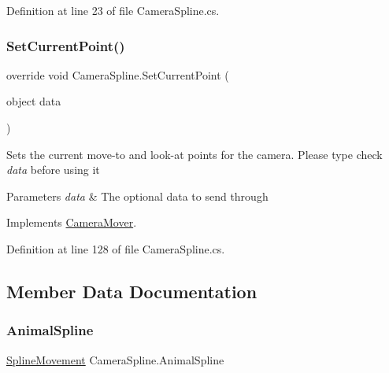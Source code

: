 Definition at line 23 of file Camera\+Spline.\+cs.

\mbox{\label{class_camera_spline_a8ff1f479307c63e3ecc75d089ff1bfcf}} 
\subsubsection{\texorpdfstring{Set\+Current\+Point()}{SetCurrentPoint()}}
{\footnotesize\ttfamily override void Camera\+Spline.\+Set\+Current\+Point (\begin{DoxyParamCaption}\item[{object}]{data }\end{DoxyParamCaption})\hspace{0.3cm}{\ttfamily [virtual]}}



Sets the current move-\/to and look-\/at points for the camera. Please type check {\itshape data}  before using it 


\begin{DoxyParams}{Parameters}
{\em data} & The optional data to send through\\
\hline
\end{DoxyParams}


Implements \mbox{\hyperlink{class_camera_mover_ab2f77d1df91324b508a7a45f1f22a04a}{Camera\+Mover}}.



Definition at line 128 of file Camera\+Spline.\+cs.



\subsection{Member Data Documentation}
\mbox{\label{class_camera_spline_ac7054bc6215716c3808cfe21326639a7}} 
\subsubsection{\texorpdfstring{Animal\+Spline}{AnimalSpline}}
{\footnotesize\ttfamily \mbox{\hyperlink{class_spline_movement}{Spline\+Movement}} Camera\+Spline.\+Animal\+Spline}



